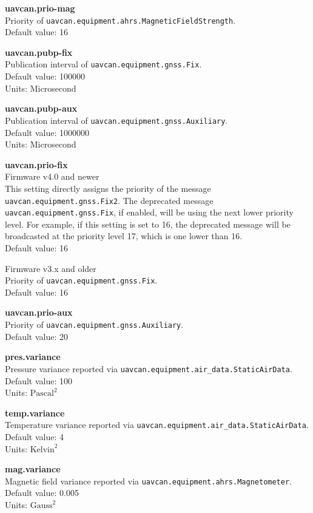 \documentclass{zubaxdoc}
\begin{document}
\textbf{uavcan.prio-mag}\\
Priority of \texttt{uavcan.equipment.ahrs.MagneticFieldStrength}.\\
Default value: 16

\textbf{uavcan.pubp-fix}\\
Publication interval of \texttt{uavcan.equipment.gnss.Fix}.\\
Default value: 100000\\
Units: Microsecond

\textbf{uavcan.pubp-aux}\\
Publication interval of \texttt{uavcan.equipment.gnss.Auxiliary}.\\
Default value: 1000000\\
Units: Microsecond

\textbf{uavcan.prio-fix}\\
Firmware v4.0 and newer\\
This setting directly assigns the priority of the message \texttt{uavcan.equipment.gnss.Fix2}. The deprecated message  \texttt{uavcan.equipment.gnss.Fix}, if enabled, will be using the next lower priority level. For example, if this setting is set to 16, the deprecated message will be broadcasted at the priority level 17, which is one lower than 16.\\
Default value: 16

Firmware v3.x and older\\
Priority of \texttt{uavcan.equipment.gnss.Fix}.\\
Default value: 16

\textbf{uavcan.prio-aux}\\
Priority of \texttt{uavcan.equipment.gnss.Auxiliary}.\\
Default value: 20

\textbf{pres.variance}\\
Pressure variance reported via \texttt{uavcan.equipment.air{\_}data.StaticAirData}.\\
Default value: 100\\
Units: $\text{Pascal}^2$

\textbf{temp.variance}\\
Temperature variance reported via \texttt{uavcan.equipment.air{\_}data.StaticAirData}.\\
Default value: 4\\
Units: $\text{Kelvin}^2$

\textbf{mag.variance}\\
Magnetic field variance reported via \texttt{uavcan.equipment.ahrs.Magnetometer}.\\
Default value: 0.005\\
Units: $\text{Gauss}^2$
\end{document}
